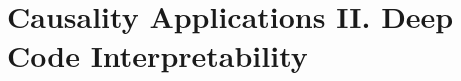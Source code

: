 \documentclass[cpp,11pt]{wmthesis}
\begin{document}
\part{Causality Applications II. \hfill \break Deep Code Interpretability}

















\appendix

%
%





\end{document}
